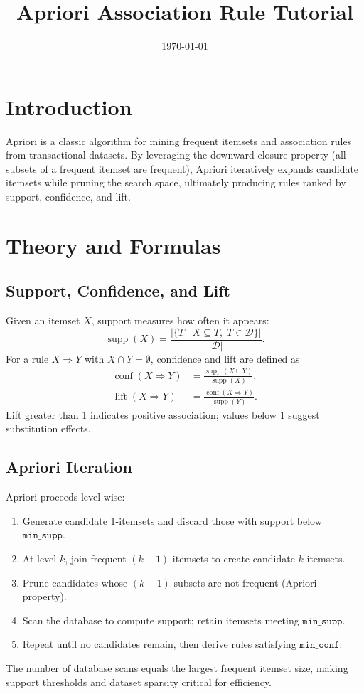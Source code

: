 ﻿\documentclass[12pt]{article}
\title{Apriori Association Rule Tutorial}
\author{}
\date{\today}
\begin{document}
\maketitle

\section{Introduction}
Apriori is a classic algorithm for mining frequent itemsets and association rules from transactional datasets. By leveraging the downward closure property (all subsets of a frequent itemset are frequent), Apriori iteratively expands candidate itemsets while pruning the search space, ultimately producing rules ranked by support, confidence, and lift.

\section{Theory and Formulas}
\subsection{Support, Confidence, and Lift}
Given an itemset \(X\), support measures how often it appears:
\begin{equation}
\operatorname{supp}(X) = \frac{\left|\{ T \mid X \subseteq T,\; T \in \mathcal{D}\}\right|}{|\mathcal{D}|}.
\end{equation}
For a rule \(X \Rightarrow Y\) with \(X \cap Y = \emptyset\), confidence and lift are defined as
\begin{align}
\operatorname{conf}(X \Rightarrow Y) &= \frac{\operatorname{supp}(X \cup Y)}{\operatorname{supp}(X)},\\
\operatorname{lift}(X \Rightarrow Y) &= \frac{\operatorname{conf}(X \Rightarrow Y)}{\operatorname{supp}(Y)}.
\end{align}
Lift greater than 1 indicates positive association; values below 1 suggest substitution effects.

\subsection{Apriori Iteration}
Apriori proceeds level-wise:
\begin{enumerate}
  \item Generate candidate 1-itemsets and discard those with support below \(\texttt{min\_supp}\).
  \item At level \(k\), join frequent \((k-1)\)-itemsets to create candidate \(k\)-itemsets.
  \item Prune candidates whose \((k-1)\)-subsets are not frequent (Apriori property).
  \item Scan the database to compute support; retain itemsets meeting \(\texttt{min\_supp}\).
  \item Repeat until no candidates remain, then derive rules satisfying \(\texttt{min\_conf}\).
\end{enumerate}
The number of database scans equals the largest frequent itemset size, making support thresholds and dataset sparsity critical for efficiency.
\end{document}
